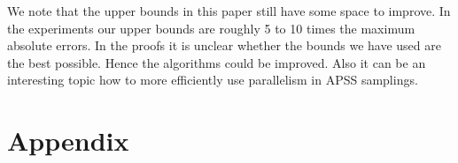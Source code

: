 \documentclass{article}
\begin{document}
We note that the upper bounds in this paper still have some space to improve. In the experiments our upper bounds are roughly 5 to 10 times the maximum absolute errors. In the proofs it is unclear whether the bounds we have used are the best possible. Hence the algorithms could be improved. Also it can be an interesting topic how to more efficiently use parallelism in APSS samplings.

%



\section{Appendix}

\end{document}
